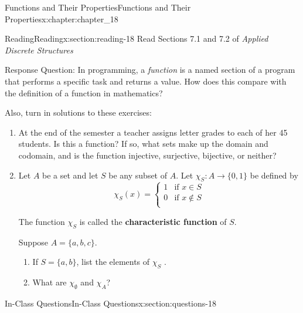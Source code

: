 \documentclass[oneside,10pt,]{book}
\newcommand{\terminology}[1]{\textbf{#1}}
\numberwithin{equation}{section}
\begin{document}
\begin{chapterptx}{Functions and Their Properties}{}{Functions and Their Properties}{}{}{x:chapter:chapter_18}
%
%
%
\typeout{************************************************}
\typeout{************************************************}
%
\begin{sectionptx}{Reading}{}{Reading}{}{}{x:section:reading-18}
Read Sections 7.1 and 7.2 of \emph{Applied Discrete Structures}%
\par
Response Question: In programming, a \emph{function} is a named section of a program that performs a specific task and returns a value.  How does this compare with the definition of a function in mathematics?%
\par
Also, turn in solutions to these exercises:%
\begin{enumerate}[label=\arabic*.]
\item{}At the end of the semester a teacher assigns letter grades to each of her 45 students. Is this a function? If so, what sets make up the domain and codomain, and is the function injective, surjective, bijective, or neither?%
\item{}Let \(A\) be a set and let \(S\) be any subset of \(A\). Let \(\chi_S: A\to \{0,1\}\) be defined by%
\begin{equation*}
\chi_S(x)= \left\{
\begin{array}{cc}
1 & \textrm{if } x\in S \\
0 & \textrm{if } x\notin S \\
\end{array}
\right.
\end{equation*}
%
\par
The function \(\chi_S\) is called the \terminology{characteristic function} of \(S\).%
\par
Suppose \(A = \{a, b, c\}\).%
\begin{enumerate}[label=(\alph*)]
\item{}If  \(S = \{a, b\}\), list the elements of \(\chi_S\) .%
\item{}What are \(\chi_{\emptyset}\) and \(\chi_A\)?%
\end{enumerate}
%
\end{enumerate}
%
\end{sectionptx}
%
%
\typeout{************************************************}
\typeout{************************************************}
%
\begin{sectionptx}{In-Class Questions}{}{In-Class Questions}{}{}{x:section:questions-18}

\end{sectionptx}
\end{chapterptx}
\end{document}
